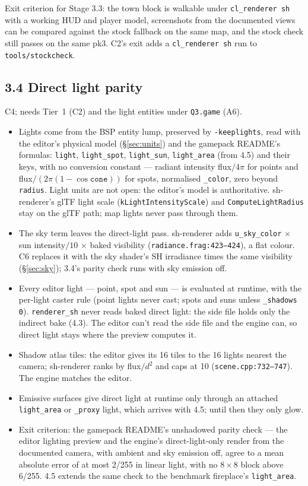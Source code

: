 \documentclass[11pt,a4paper]{article}
\begin{document}
Exit criterion for Stage 3.3: the town block is walkable under \texttt{cl\_renderer sh} with a
working HUD and player model, screenshots from the documented views can be compared against the
stock fallback on the same map, and the stock check still passes on the same pk3. C2's exit adds
a \texttt{cl\_renderer sh} run to \texttt{tools/stockcheck}.

\subsection{3.4 Direct light parity}
C4; needs Tier~1 (C2) and the light entities under \texttt{Q3.game} (A6).
\begin{itemize}
\item Lights come from the BSP entity lump, preserved by \texttt{-keeplights}, read with the
  editor's physical model (§\ref{sec:units}) and the gamepack README's formulas: \texttt{light},
  \texttt{light\_spot}, \texttt{light\_sun}, \texttt{light\_area} (from 4.5) and their keys,
  with no conversion constant --- radiant intensity flux$/4\pi$ for points and
  flux$/(2\pi(1-\cos\texttt{cone}))$ for spots, normalised \texttt{\_color}, zero beyond
  \texttt{radius}. Light units are not open: the editor's model is authoritative. sh-renderer's
  glTF light scale (\texttt{kLightIntensityScale}) and \texttt{ComputeLightRadius} stay on the glTF
  path; map lights never pass through them.
\item The sky term leaves the direct-light pass. sh-renderer adds \texttt{u\_sky\_color}
  $\times$ sun intensity$/10$ $\times$ baked visibility (\texttt{radiance.frag:423--424}), a flat
  colour. C6 replaces it with the sky shader's SH irradiance times the same visibility
  (§\ref{sec:sky}); 3.4's parity check runs with sky emission off.
\item Every editor light --- point, spot and sun --- is evaluated at runtime, with the per-light
  caster rule (point lights never cast; spots and suns unless \texttt{\_shadows 0}). \texttt{renderer\_sh} never
  reads baked direct light: the side file holds only the indirect bake (4.3). The editor can't read
  the side file and the engine can, so direct light stays where the preview computes it.
\item Shadow atlas tiles: the editor gives its 16 tiles to the 16 lights nearest the camera;
  sh-renderer ranks by flux$/d^2$ and caps at 10 (\texttt{scene.cpp:732--747}). The engine matches
  the editor.
\item Emissive surfaces give direct light at runtime only through an attached \texttt{light\_area}
  or \texttt{\_proxy} light, which arrives with 4.5; until then they only glow.
\item Exit criterion: the gamepack README's unshadowed parity check --- the editor lighting preview
  and the engine's direct-light-only render from the documented camera, with ambient and sky
  emission off, agree to a mean absolute error of at most 2/255 in linear light, with no
  $8\times8$ block above 6/255. 4.5 extends the same check to the benchmark fireplace's
  \texttt{light\_area}.
\end{itemize}
\end{document}
